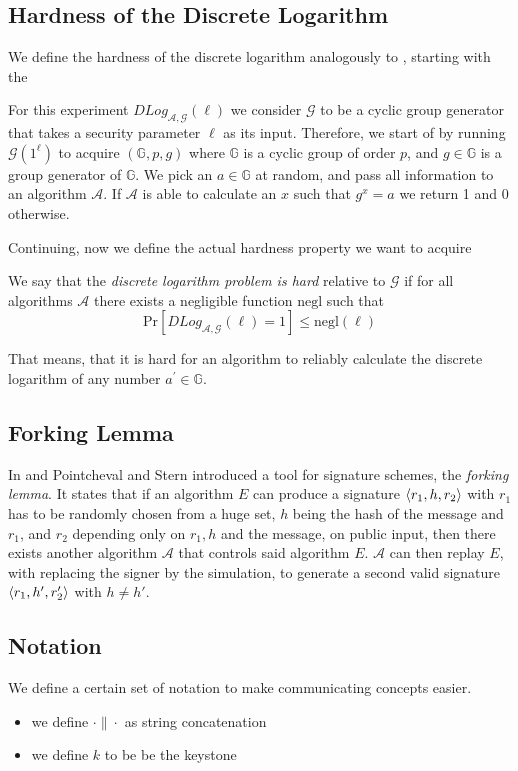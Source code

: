 \subsection{Hardness of the Discrete Logarithm}
  We define the hardness of the discrete logarithm analogously to \cite{katz2014introduction}, starting with the

  \begin{definition}
    For this experiment \(DLog_{\mathcal{A}, \mathcal{G}}(\ell)\)  we consider \(\mathcal{G}\) to be a cyclic group generator that takes a security parameter \(\ell\) as its input.
    Therefore, we start of by running \(\mathcal{G}(1^\ell)\) to acquire \((\mathbb{G}, p, g)\) where $\mathbb{G}$ is a cyclic group of order \(p\), and \(g\in\mathbb{G}\) is a group generator of \(\mathbb{G}\).
    We pick an \(a\in\mathbb{G}\) at random, and pass all information to an algorithm \(\mathcal{A}\).
    If \(\mathcal{A}\) is able to calculate an \(x\) such that \(g^x = a\) we return 1 and 0 otherwise.
  \end{definition}

  Continuing, now we define the actual hardness property we want to acquire

  \begin{definition}
    We say that the \textit{discrete logarithm problem is hard} relative to \(\mathcal{G}\) if for all algorithms \(\mathcal{A}\) there exists a negligible function \(\mathrm{negl}\) such that
      \[\mathrm{Pr}[DLog_{\mathcal{A}, \mathcal{G}}(\ell) = 1] \leq \mathrm{negl}(\ell)\]
  \end{definition}

  That means, that it is hard for an algorithm to reliably calculate the discrete logarithm of any number \(a^\prime\in\mathbb{G}\).

\subsection{Forking Lemma}
  In \cite{pcstern96} and \cite{pointcheval2000security}  Pointcheval and Stern introduced a tool for signature schemes, the \textit{forking lemma}. 
  It states that if an algorithm \(E\) can produce a signature \(\langle r_1, h, r_2 \rangle\) with \(r_1\) has to be randomly chosen from a huge set, \(h\) being the hash of the message and \(r_1\), and \(r_2\) depending only on \(r_1, h\) and the message, on public input, then there exists another algorithm \(\mathcal{A}\) that controls said algorithm \(E\).
  \(\mathcal{A}\) can then replay \(E\), with replacing the signer by the simulation, to generate a second valid signature \(\langle r_1, h', r_2' \rangle\) with \(h\neq h'\).

\subsection{Notation}
  We define a certain set of notation to make communicating concepts easier.
  \begin{itemize}
    \item we define \(\cdot \| \cdot \) as string concatenation
    \item we define \(k\) to be be the keystone
  \end{itemize}